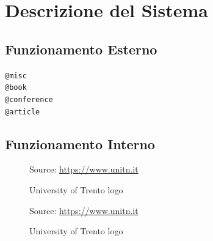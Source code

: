 \chapter{Descrizione del Sistema}
\label{cha:descrizione}

\section{Funzionamento Esterno}
\label{cha:funzionamento_esterno}

\texttt{@misc}\cite{misc} \\ %
\texttt{@book}\cite{book} \\ %
\texttt{@conference}\cite{conference} \\ %
\texttt{@article}\cite{article}

\section{Funzionamento Interno}
\label{cha:funzionamento_interno}

\begin{figure}[htbp]
  \centering
  \def\stackalignment{r} %
  {\scriptsize Source: \url{https://www.unitn.it} }
  \caption{University of Trento logo}
  \label{fig:unitn}
\end{figure}

\begin{figure} %
  \centering
  \def\stackalignment{r} %
  {\scriptsize \parbox[t]{\linewidth}{ Source: \url{https://www.unitn.it}} }
  \caption{University of Trento logo}
  \label{fig:unitn_wrapfigure_right}
\end{figure}

